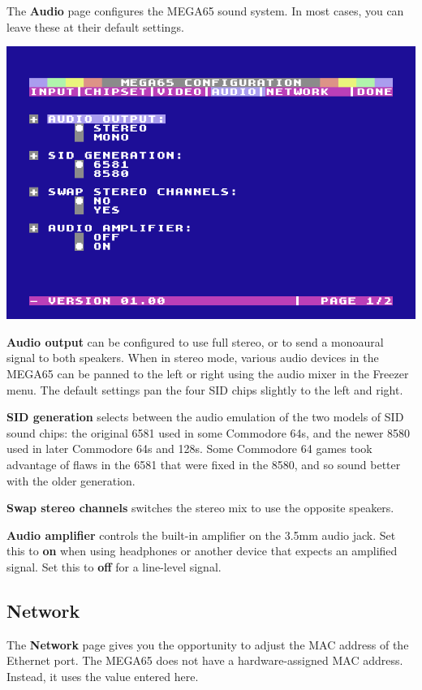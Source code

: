 The {\bf Audio} page configures the MEGA65 sound system. In most cases, you can leave these at their default settings.

\begin{center}
  \includegraphics[width=0.7\linewidth]{images/ss-m65config-4.png}
\end{center}

{\bf Audio output} can be configured to use full stereo, or to send a monoaural signal to both speakers. When in stereo mode, various audio devices in the MEGA65 can be panned to the left or right using the audio mixer in the Freezer menu. The default settings pan the four SID chips slightly to the left and right.

{\bf SID generation} selects between the audio emulation of the two models of SID sound chips: the original 6581 used in some Commodore 64s, and the newer 8580 used in later Commodore 64s and 128s. Some Commodore 64 games took advantage of flaws in the 6581 that were fixed in the 8580, and so sound better with the older generation.

{\bf Swap stereo channels} switches the stereo mix to use the opposite speakers.

{\bf Audio amplifier} controls the built-in amplifier on the 3.5mm audio jack. Set this to {\bf on} when using headphones or another device that expects an amplified signal. Set this to {\bf off} for a line-level signal.

\subsection{Network}

The {\bf Network} page gives you the opportunity to adjust the MAC address of the Ethernet port. The MEGA65 does not have a hardware-assigned MAC address. Instead, it uses the value entered here.


